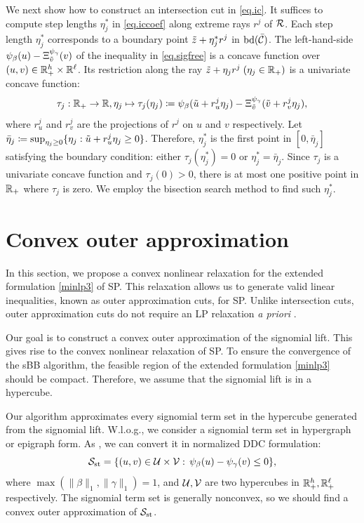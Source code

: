 We next show how to construct an intersection cut in \eqref{eq.ic}. It suffices to compute  step lengths $\eta^\ast_j$ in \eqref{eq.iccoef} along extreme rays $r^j$ of $\mathcal R$. Each step length $\eta^\ast_j$ corresponds to a boundary point $\tilde{z}+ \eta^\ast_j r^j$ in $\operatorname{bd}(\bar{\mathcal C})$. The left-hand-side $\psi_{\beta}(u) - {\Xi^{\psi_{\gamma}}_{\tilde{v}}}(v)$  of the inequality in \eqref{eq.sigfree} is a concave function over $(u,v) \in \mathbb R_{+}^h \times \mathbb R^{\ell}$. Its  restriction along the ray $\tilde{z}+ \eta_j r^j \;(\eta_j \in \mathbb R_+)$ is a univariate concave function:
\begin{equation*}
 \tau_j:\mathbb R_+ \to \mathbb R, \eta_j \mapsto  \tau_j(\eta_j) \coloneqq \psi_{\beta}(\tilde{u} +  r^j_u \eta_j)  - {\Xi^{\psi_{\gamma}}_{\tilde{v}}}(\tilde{v}+ r^j_v\eta_j),
\end{equation*}
where $r^j_u$ and $r^j_v$ are the projections of $r^j$ on $u$ and $v$ respectively. Let
$	\bar{\eta}_j \coloneqq \sup_{\eta_j \ge 0}\{\eta_j:\tilde{u} +  r^j_u \eta_j \ge 0\}$.
 Therefore, $\eta^\ast_j$ is the first point in $[0,\bar{\eta}_j]$  satisfying the boundary condition: either $ \tau_j(\eta^\ast_j) = 0$ or $\eta^\ast_j = \bar{\eta}_j$. Since  $\tau_j$ is a univariate concave function and $\tau_j(0) > 0$, there is at most one positive point in $\mathbb R_+$ where $\tau_j$ is zero. We employ the bisection search method \cite{press2007chapter} to find such $\eta^\ast_j$.


 
 
 


\section{Convex outer approximation}
\label{sec.outerforsp}

In this section, we propose a convex nonlinear relaxation for the extended formulation \eqref{minlp3} of SP. This relaxation allows us to generate valid linear inequalities, known as outer approximation cuts, for SP. Unlike intersection cuts, outer approximation cuts do not require an LP relaxation \textit{a priori} .

Our goal is to construct a convex outer approximation of  the signomial lift. This gives rise to the convex nonlinear relaxation of SP.  To ensure the convergence of the sBB algorithm,  the feasible region of the extended formulation \eqref{minlp3} should be compact. 
Therefore, we assume that the signomial lift is in a hypercube. 

 Our algorithm approximates every signomial term set in the hypercube generated from the signomial lift. W.l.o.g., we consider a signomial term set in hypergraph or epigraph form. As , 
we can convert it in normalized DDC formulation:
\begin{equation}
\label{eq.st2}
	\mathcal S_{\mathrm{st}} =  \{(u, v) \in \mathcal U \times \mathcal V:\, \psi_{\beta}(u) - \psi_{\gamma}(v) \le 0\},
\end{equation}
where $ \max(\lVert \beta \rVert_1, \lVert \gamma \rVert_1 ) = 1$, and $\mathcal U,\mathcal V$ are two hypercubes in $\mathbb R_{+}^{h}, \mathbb R_{+}^{\ell}$ respectively. The signomial term set is generally nonconvex, so we should find a convex outer approximation of $\mathcal S_{\mathrm{st}}$.


